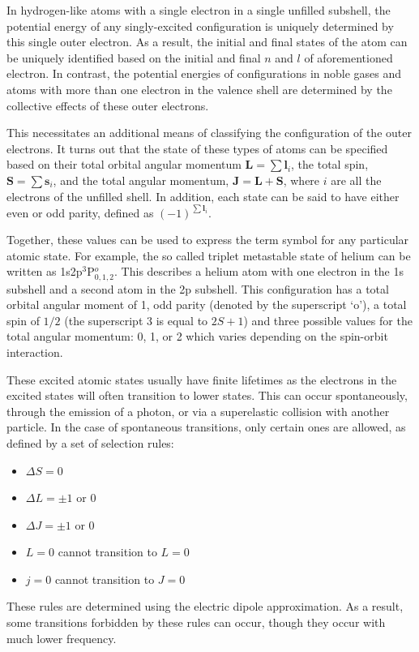 In hydrogen-like atoms with a single electron in a single unfilled subshell, the
potential energy of any singly-excited configuration is uniquely determined by
this single outer electron. As a result, the initial and final states of the
atom can be uniquely identified based on the initial and final $n$ and $l$ of
aforementioned electron. In contrast, the potential energies of configurations
in noble gases and atoms with more than one electron in the valence shell are
determined by the collective effects of these outer electrons.

This necessitates an additional means of classifying the configuration of the
outer electrons. It turns out that the state of these types of atoms can be
specified based on their total orbital angular momentum $\bm{L}=\sum \bm{l}_i$,
the total spin, $\bm{S}=\sum \bm{s}_i$, and the total angular momentum,
$\bm{J}=\bm{L}+\bm{S}$, where $i$ are all the electrons of the unfilled shell.
In addition, each state can be said to have either even or odd parity, defined
as $(-1)^{\sum\bm{l}_i}$.

Together, these values can be used to express the term symbol for any particular
atomic state. For example, the so called triplet metastable state of helium can
be written as 1s2p$^3$P$^o_{0,1,2}$. This describes a helium atom with one
electron in the 1s subshell and a second atom in the 2p subshell. This
configuration has a total orbital angular moment of 1, odd parity (denoted by
the superscript `o'), a total spin of $1/2$ (the superscript $3$ is equal to
$2S+1$) and three possible values for the total angular momentum: 0, 1, or 2
which varies depending on the spin-orbit interaction.

These excited atomic states usually have finite lifetimes as the electrons in
the excited states will often transition to lower states. This can occur
spontaneously, through the emission of a photon, or via a superelastic collision
with another particle. In the case of spontaneous transitions, only certain ones
are allowed, as defined by a set of selection rules:
\begin{itemize}
  \item $\Delta S = 0$
  \item $\Delta L = \pm1$ or 0
  \item $\Delta J = \pm1$ or 0
  \item $L=0$ cannot transition to $L=0$
  \item $j=0$ cannot transition to $J=0$
\end{itemize}
These rules are determined using the electric dipole approximation. As a result,
some transitions forbidden by these rules can occur, though they occur with much
lower frequency.

